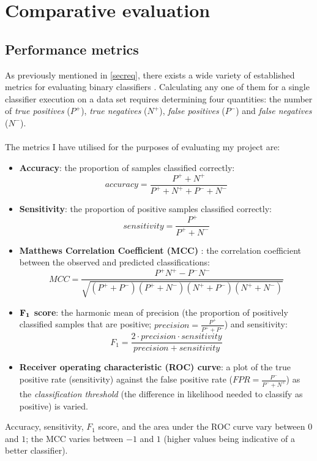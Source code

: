 \documentclass[12pt,a4paper,twoside,openright]{report}
\begin{document}
\section{Comparative evaluation}\label{seccompeval}

\subsection{Performance metrics}

As previously mentioned in \cref{secreq}, there exists a wide variety of established metrics for evaluating binary classifiers \cite{powers2011evaluation}. Calculating any one of them for a single classifier execution on a data set requires determining four quantities: the number of \emph{true positives} ($P^+$), \emph{true negatives} ($N^+$), \emph{false positives} ($P^-$) and \emph{false negatives} ($N^-$).\\ \\
The metrics I have utilised for the purposes of evaluating my project are:
\begin{itemize}
	\item {\bf Accuracy}: the proportion of samples classified correctly:
\[accuracy = \frac{P^+ + N^+}{P^+ + N^+ + P^- + N^-}\]
	\item {\bf Sensitivity}: the proportion of positive samples classified correctly:
\[sensitivity = \frac{P^+}{P^+ + N^-}\]
	\item {\bf Matthews Correlation Coefficient (MCC)} \cite{matthews1975comparison}: the correlation coefficient between the observed and predicted classifications: 
\[MCC = \frac{P^+N^+ - P^-N^-}{\sqrt{(P^++P^-)(P^++N^-)(N^++P^-)(N^++N^-)}}\]
	\item {\bf ${\bf F}_{\bf 1}$ score}: the harmonic mean of precision (the proportion of positively classified samples that are positive; $precision = \frac{P^+}{P^++P^-}$) and sensitivity:
\[F_1 = \frac{2\cdot precision\cdot sensitivity}{precision + sensitivity}\] 
	\item \textbf{Receiver operating characteristic (ROC) curve}: a plot of the true positive rate (sensitivity) against the false positive rate ($FPR = \frac{P^-}{P^- + N^+}$) as the \emph{classification threshold} (the difference in likelihood needed to classify as positive) is varied.
\end{itemize}
Accuracy, sensitivity, $F_1$ score, and the area under the ROC curve vary between $0$ and $1$; the MCC varies between $-1$ and $1$ (higher values being indicative of a better classifier).
\end{document}
